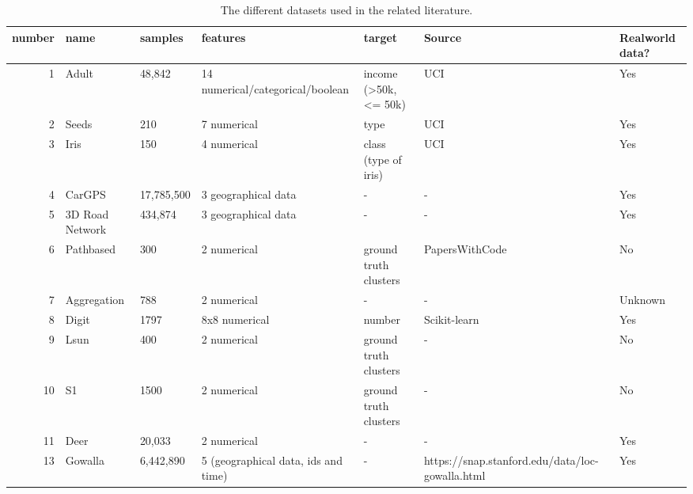 \begin{table}
  \centering
  \begin{adjustbox}{width=1\textwidth}

    \begin{tabular}{rllllll}
      \toprule
      number & name            & samples    & features                            & target                & Source                                          & Realworld data? \\
      \midrule
      1      & Adult           & 48,842     & 14 numerical/categorical/boolean    & income (>50k, <= 50k) & UCI                                             & Yes             \\
      2      & Seeds           & 210        & 7 numerical                         & type                  & UCI                                             & Yes             \\
      3      & Iris            & 150        & 4 numerical                         & class (type of iris)  & UCI                                             & Yes             \\
      4      & CarGPS          & 17,785,500 & 3 geographical data                 & -                     & -                                               & Yes             \\
      5      & 3D Road Network & 434,874    & 3 geographical data                 & -                     & -                                               & Yes             \\
      6      & Pathbased       & 300        & 2 numerical                         & ground truth clusters & PapersWithCode                                  & No              \\
      7      & Aggregation     & 788        & 2 numerical                         & -                     & -                                               & Unknown         \\
      8      & Digit           & 1797       & 8x8 numerical                       & number                & Scikit-learn                                    & Yes             \\
      9      & Lsun            & 400        & 2 numerical                         & ground truth clusters & -                                               & No              \\
      10     & S1              & 1500       & 2 numerical                         & ground truth clusters & -                                               & No              \\
      11     & Deer            & 20,033     & 2 numerical                         & -                     & -                                               & Yes             \\
      13     & Gowalla         & 6,442,890  & 5 (geographical data, ids and time) & -                     & https://snap.stanford.edu/data/loc-gowalla.html & Yes             \\
      \bottomrule
    \end{tabular}
  \end{adjustbox}
  \caption{The different datasets used in the related literature.}
  \label{tab:datasets}
\end{table}